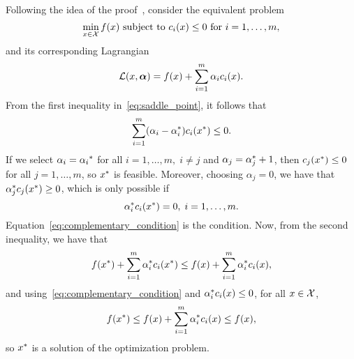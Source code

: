 Following the idea of the proof~\citep{ScholkopfS02}, consider the equivalent problem
    \begin{equation}
        \nonumber
        \min_{x \in \mathcal{X}} f(x) \text{ subject to } c_i(x) \leq 0 \text{ for } i=1, \ldots, m ,
    \end{equation}
and its corresponding Lagrangian
\begin{equation}
    \nonumber
    \mathcal{L}(x, \bm{\alpha}) = f(x) + \sum_{i=1}^m \alpha_i c_i(x) .
\end{equation}
From the first inequality in~\eqref{eq:saddle_point}, it follows that 
$$ \sum_{i=1}^m (\alpha_i- {\alpha}^*_i) c_i({x}^*) \leq 0 .$$
If we select $\alpha_i = {\alpha_i}^*$ for all $i=1, \ldots, m,\; i \neq j$ and $\alpha_{j} = {\alpha}^*_{j} + 1$, then
$c_j({x}^*) \leq 0$ for all $j=1, \ldots, m$, so ${x}^*$ is feasible.
%
Moreover, choosing $\alpha_{j} = 0$, we have that ${\alpha}^*_j c_j({x}^*) \geq 0$, which is only possible if 
\begin{equation}\label{eq:complementary_condition}
    \opt{\alpha}_i c_i(\opt{x}) = 0 , \; i=1, \ldots, m .
\end{equation}
Equation~\eqref{eq:complementary_condition} is the condition. Now, from the second inequality, we have that
\begin{equation}
    \nonumber
    f({x}^*) + \sum_{i=1}^m {\alpha}^*_i c_i({x}^*) \leq f(x) + \sum_{i=1}^m {\alpha}^*_i c_i(x) ,
\end{equation}
and using~\eqref{eq:complementary_condition} and ${\alpha}^*_i c_i(x) \leq 0$, for all $x \in \mathcal{X}$,
\begin{equation}
    \nonumber
    f({x}^*) \leq f(x) + \sum_{i=1}^m {\alpha}^*_i c_i(x) \leq f(x) ,
\end{equation}
so ${x}^*$ is a solution of the optimization problem.

